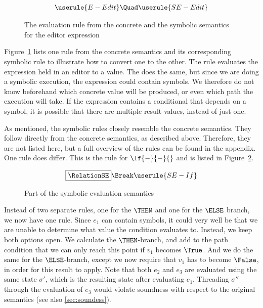 \begin{figure}[h]
  \small
  \begin{gather*}
    \userule{E-Edit}\Quad
    \userule{SE-Edit}
  \end{gather*}
  \caption{The evaluation rule from the concrete and the symbolic semantics for the editor expression}
  \label{fig:oldToNewSemantics}
\end{figure}

Figure~\ref{fig:oldToNewSemantics} lists one rule from the concrete semantics and its corresponding symbolic rule to illustrate how to convert one to the other.
The  rule evaluates the expression held in an editor to a value.
The  does the same, but since we are doing a symbolic execution, the expression could contain symbols.
We therefore do not know beforehand which concrete value will be produced, or even which path the execution will take.
If the expression contains a conditional that depends on a symbol, it is possible that there are multiple result values, instead of just one.


As mentioned, the symbolic rules closely resemble the concrete semantics.
They follow directly from the concrete semantics, as described above.
Therefore, they are not listed here, but a full overview of the rules can be found in the appendix.
One rule does differ.
This is the rule for $\If{-}{-}{}$ and is listed in Figure~\ref{fig:eval}.

\begin{figure}[h]
  \small
  \begin{gather*}
    \boxed{\RelationSE} \Break
    \userule{SE-If}
  \end{gather*}
  \caption{Part of the symbolic evaluation semantics}
  \label{fig:eval}
\end{figure}

Instead of two separate rules, one for the $\THEN$ and one for the $\ELSE$ branch, we now have one  rule.
Since $e_1$ can contain symbols, it could very well be that we are unable to determine what value the condition evaluates to.
Instead, we keep both options open.
We calculate the $\THEN$-branch, and add to the path condition that we can only reach this point if $v_1$ becomes $\True$.
And we do the same for the $\ELSE$-branch, except we now require that $v_1$ has to become $\False$, in order for this result to apply.
Note that both $e_2$ and $e_3$ are evaluated using the same state $\sigma'$,
which is the resulting state after evaluating $e_1$.
Threading $\sigma''$ through the evaluation of $e_3$ would violate soundness with respect to the original semantics (see also \cref{sec:soundess}).



